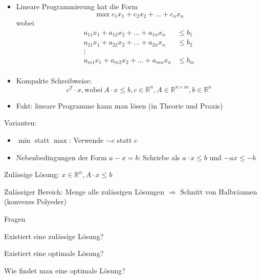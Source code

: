 \begin{itemize}
 \item Lineare Programmierung hat die Form
     \[\max c_1x_1 + c_2x_2 + ... + c_nx_n\]
     wobei
     \begin{align*}
      a_{11}x_1 + a_{12}x_2 + ... + a_{1n}x_n &\leq b_1 \\
      a_{21}x_1 + a_{22}x_2 + ... + a_{2n}x_n &\leq b_2 \\
      \vdots\\
      a_{m1}x_1 + a_{m2}x_2 + ... + a_{mn}x_n &\leq b_m \\
     \end{align*}
 \item Kompakte Schreibweise:
     \[c^T \cdot x, \text{wobei}\ A \cdot x \leq b, c \in \mathbb{R}^n, A \in \mathbb{R}^{n \times m}, b \in \mathbb{R}^n\]
 \item Fakt: lineare Programme kann man lösen (in Theorie und Praxis)
\end{itemize}
Varianten:
\begin{itemize}
 \item $\min$ statt $\max$: Verwende $-c$ statt $c$
 \item Nebenbedingungen der Form $a - x = b$: Schriebe als $a\cdot x \leq b$ und $-ax \leq -b$
\end{itemize}

\begin{description}
 \item Zulässige Lösung: $x \in \mathbb{R}^n, A \cdot x \leq b$
 \item Zulässiger Bereich: Menge alle zulässigen Lösungen $\Rightarrow$ Schnitt von Halbräumen (konvexes Polyeder)
\end{description}
Fragen
\begin{description}
 \item Existiert eine zulässige Lösung?
 \item Existiert eine optimale Lösung?
 \item Wie findet man eine optimale Lösung?
\end{description}

